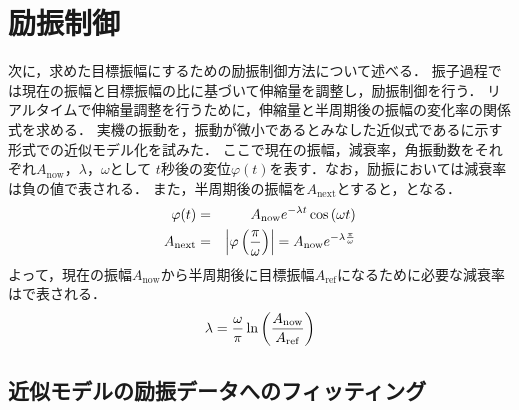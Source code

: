         \section{励振制御}
          次に，求めた目標振幅にするための励振制御方法について述べる．
          振子過程では現在の振幅と目標振幅の比に基づいて伸縮量を調整し，励振制御を行う．
          リアルタイムで伸縮量調整を行うために，伸縮量と半周期後の振幅の変化率の関係式を求める．
          実機の振動を，振動が微小であるとみなした近似式であるに示す形式での近似モデル化を試みた．
          ここで現在の振幅，減衰率，角振動数をそれぞれ$A_{\mathrm{now}}$，$\lambda$，$\omega$として
          $t$秒後の変位$\varphi(t)$を表す．なお，励振においては減衰率は負の値で表される．
          また，半周期後の振幅を$A_{\mathrm{next}}$とすると，となる．
          \begin{eqnarray}
            \equlabel{Approximation Model}
            \varphi(t)&=&A_{\mathrm{now}}e^{-\lambda t}\cos{(\omega t)}\\
            \equlabel{amp rate}
            A_{\mathrm{next}}&=&\left|\varphi\left(\frac{\pi}{\omega}\right)\right|=A_{\mathrm{now}}e^{-\lambda \frac{\pi}{\omega}}
          \end{eqnarray}
          よって，現在の振幅$A_{\mathrm{now}}$から半周期後に目標振幅$A_{\mathrm{ref}}$になるために必要な減衰率はで表される．
          \begin{eqnarray}
            \equlabel{lambda}
            \lambda=\frac{\omega}{\pi}\ln{\left(\frac{A_{\mathrm{now}}}{A_{\mathrm{ref}}}\right)}
          \end{eqnarray}

        \subsection{近似モデルの励振データへのフィッティング}
          
